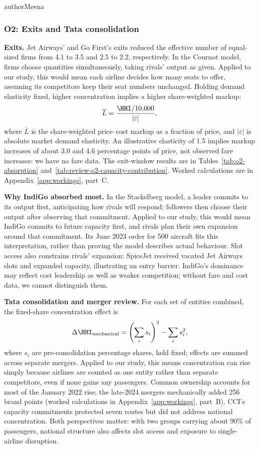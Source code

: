 \begin{mergedcontribution}{authorMeena}
\subsubsection{O2: Exits and Tata consolidation}
\textbf{Exits.} Jet Airways' and Go First's exits reduced the effective number of equal-sized firms from 4.1 to 3.5 and 2.5 to 2.2, respectively. In the Cournot model, firms choose quantities simultaneously, taking rivals' output as given. Applied to our study, this would mean each airline decides how many seats to offer, assuming its competitors keep their seat numbers unchanged. Holding demand elasticity fixed, higher concentration implies a higher share-weighted markup:
\[
\overline{L} = \frac{\HHI/10{,}000}{|\varepsilon|},
\]
where $\overline{L}$ is the share-weighted price--cost markup as a fraction of price, and $|\varepsilon|$ is absolute market demand elasticity. An illustrative elasticity of 1.5 implies markup increases of about 3.0 and 4.6 percentage points of price, not observed fare increases: we have no fare data. The exit-window results are in Tables~\ref{tab:o2-absorption} and~\ref{tab:review-o2-capacity-contribution}. Worked calculations are in Appendix~\ref{app:workings}, part~C.

\textbf{Why IndiGo absorbed most.} In the Stackelberg model, a leader commits to its output first, anticipating how rivals will respond; followers then choose their output after observing that commitment. Applied to our study, this would mean IndiGo commits to future capacity first, and rivals plan their own expansion around that commitment. Its June 2023 order for 500 aircraft fits this interpretation, rather than proving the model describes actual behaviour. Slot access also constrains rivals' expansion: SpiceJet received vacated Jet Airways slots and expanded capacity, illustrating an entry barrier. IndiGo's dominance may reflect cost leadership as well as weaker competition; without fare and cost data, we cannot distinguish them.

\textbf{Tata consolidation and merger review.} For each set of entities combined, the fixed-share concentration effect is
\[
\Delta\HHI_{\text{mechanical}} = \left(\sum_i s_i\right)^2 - \sum_i s_i^2,
\]
where $s_i$ are pre-consolidation percentage shares, held fixed; effects are summed across separate mergers. Applied to our study, this means concentration can rise simply because airlines are counted as one entity rather than separate competitors, even if none gains any passengers. Common ownership accounts for most of the January 2022 rise; the late-2024 mergers mechanically added 256 brand \HHI{} points (worked calculations in Appendix~\ref{app:workings}, part~B). CCI's capacity commitments protected seven routes but did not address national concentration. Both perspectives matter: with two groups carrying about 90\% of passengers, national structure also affects slot access and exposure to single-airline disruption.
\end{mergedcontribution}

